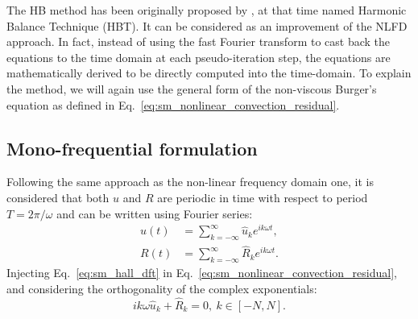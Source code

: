 
The HB method has been originally
proposed by \citet{Hall2002}, at that time named
Harmonic Balance Technique (HBT).
It can be considered as an improvement of the NLFD
approach. In fact, instead
of using the fast Fourier transform to cast back the equations
to the time domain at each pseudo-iteration step, 
the equations are mathematically derived to be directly
computed into the time-domain.
To explain the method, we will again use the general form of 
the non-viscous Burger's equation as defined in
Eq.~\eqref{eq:sm_nonlinear_convection_residual}.


\subsection{Mono-frequential formulation}

Following the same approach as the non-linear frequency domain one,
it is considered that both $u$ and $R$ are periodic
in time with respect to period $T = 2 \pi / \omega$
and can be written using Fourier series:
\begin{equation}
	\begin{split}
		u(t) &= \sum_{k=-\infty}^{\infty} \widehat{u}_k e^{i k \omega t}, \\
		R(t) &= \sum_{k=-\infty}^{\infty} \widehat{R}_k e^{i k \omega t}.
		\label{eq:sm_hall_dft}
	\end{split}
\end{equation}
Injecting Eq.~\eqref{eq:sm_hall_dft} in 
Eq.~\eqref{eq:sm_nonlinear_convection_residual}, and considering
the orthogonality of the complex exponentials:
\begin{equation}
	i k \omega \widehat{u}_k + \widehat{R}_k = 0, \: k \in [-N, N].
	\label{eq:sm_hall_frequential_eq}
\end{equation}

